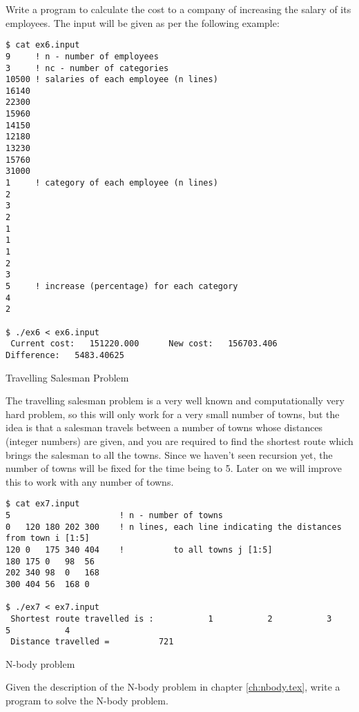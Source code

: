 Write a program to calculate the cost to a company of increasing the salary of
its employees. The input will be given as per the following example:

\begin{verbatim}
$ cat ex6.input
9     ! n - number of employees
3     ! nc - number of categories
10500 ! salaries of each employee (n lines)
16140
22300
15960
14150
12180
13230
15760
31000
1     ! category of each employee (n lines)
2
3
2
1
1
1
2
3
5     ! increase (percentage) for each category
4
2

$ ./ex6 < ex6.input
 Current cost:   151220.000      New cost:   156703.406     Difference:   5483.40625    
\end{verbatim}


 {Travelling Salesman Problem}

The travelling salesman problem is a very well known and computationally very
hard problem, so this will only work for a very small number of towns, but the
idea is that a salesman travels between a number of towns whose distances
(integer numbers) are given, and you are required to find the shortest route
which brings the salesman to all the towns. Since we haven't seen recursion yet,
the number of towns will be fixed for the time being to 5. Later on we will
improve this to work with any number of towns.

\begin{verbatim}
$ cat ex7.input
5                      ! n - number of towns
0   120 180 202 300    ! n lines, each line indicating the distances from town i [1:5]
120 0   175 340 404    !          to all towns j [1:5]
180 175 0   98  56
202 340 98  0   168
300 404 56  168 0

$ ./ex7 < ex7.input
 Shortest route travelled is :           1           2           3           5           4
 Distance travelled =          721
\end{verbatim}

 {N-body problem}

Given the description of the N-body problem in chapter \ref{ch:nbody.tex}, write
a program to solve the N-body problem.




